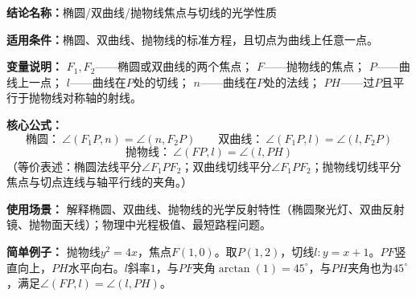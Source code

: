 \textbf{结论名称：}椭圆/双曲线/抛物线焦点与切线的光学性质

\textbf{适用条件：}椭圆、双曲线、抛物线的标准方程，且切点为曲线上任意一点。

\textbf{变量说明：}
$F_1,F_2$——椭圆或双曲线的两个焦点；
$F$——抛物线的焦点；
$P$——曲线上一点；
$l$——曲线在$P$处的切线；
$n$——曲线在$P$处的法线；
$PH$——过$P$且平行于抛物线对称轴的射线。

\textbf{核心公式：}
\[
\boxed{\text{椭圆：}\ \angle(F_1P,n)=\angle(n,F_2P)} \qquad
\boxed{\text{双曲线：}\ \angle(F_1P,l)=\angle(l,F_2P)}
\]
\[
\boxed{\text{抛物线：}\ \angle(FP,l)=\angle(l,PH)}
\]
（等价表述：椭圆法线平分$\angle F_1PF_2$；双曲线切线平分$\angle F_1PF_2$；抛物线切线平分焦点与切点连线与轴平行线的夹角。）

\textbf{使用场景：}
解释椭圆、双曲线、抛物线的光学反射特性（椭圆聚光灯、双曲反射镜、抛物面天线）；物理中光程极值、最短路程问题。

\textbf{简单例子：}
抛物线$y^2=4x$，焦点$F(1,0)$。取$P(1,2)$，切线$l:y=x+1$。$PF$竖直向上，$PH$水平向右。$l$斜率$1$，与$PF$夹角$\arctan(1)=45^\circ$，与$PH$夹角也为$45^\circ$，满足$\angle(FP,l)=\angle(l,PH)$。